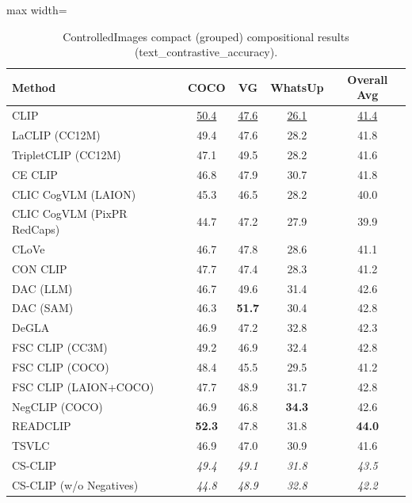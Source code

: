 \begin{table}[t]
  \centering
  \scriptsize
  \caption{ControlledImages compact (grouped) compositional results (text_contrastive_accuracy).}
  \label{tab:ControlledImages_compact}
  \begin{adjustbox}{max width=\textwidth}
  \setlength{\tabcolsep}{2pt}
  \begin{tabular}{p{5cm}ccc|c}
    \toprule
    Method & COCO & VG & WhatsUp & Overall Avg \\
    \midrule
    CLIP & \underline{50.4} & \underline{47.6} & \underline{26.1} & \underline{41.4} \\
    \midrule
    LaCLIP (CC12M) & 49.4 & 47.6 & 28.2 & 41.8 \\
    TripletCLIP (CC12M) & 47.1 & 49.5 & 28.2 & 41.6 \\
    \midrule
    CE CLIP & 46.8 & 47.9 & 30.7 & 41.8 \\
    CLIC CogVLM (LAION) & 45.3 & 46.5 & 28.2 & 40.0 \\
    CLIC CogVLM (PixPR RedCaps) & 44.7 & 47.2 & 27.9 & 39.9 \\
    CLoVe & 46.7 & 47.8 & 28.6 & 41.1 \\
    CON CLIP & 47.7 & 47.4 & 28.3 & 41.2 \\
    DAC (LLM) & 46.7 & 49.6 & 31.4 & 42.6 \\
    DAC (SAM) & 46.3 & \textbf{51.7} & 30.4 & 42.8 \\
    DeGLA & 46.9 & 47.2 & 32.8 & 42.3 \\
    FSC CLIP (CC3M) & 49.2 & 46.9 & 32.4 & 42.8 \\
    FSC CLIP (COCO) & 48.4 & 45.5 & 29.5 & 41.2 \\
    FSC CLIP (LAION+COCO) & 47.7 & 48.9 & 31.7 & 42.8 \\
    NegCLIP (COCO) & 46.9 & 46.8 & \textbf{34.3} & 42.6 \\
    READCLIP & \textbf{52.3} & 47.8 & 31.8 & \textbf{44.0} \\
    TSVLC & 46.9 & 47.0 & 30.9 & 41.6 \\
    \midrule
    CS-CLIP & \emph{49.4} & \emph{49.1} & \emph{31.8} & \emph{43.5} \\
    CS-CLIP (w/o Negatives) & \emph{44.8} & \emph{48.9} & \emph{32.8} & \emph{42.2} \\
    \bottomrule
  \end{tabular}
  \end{adjustbox}
\end{table}